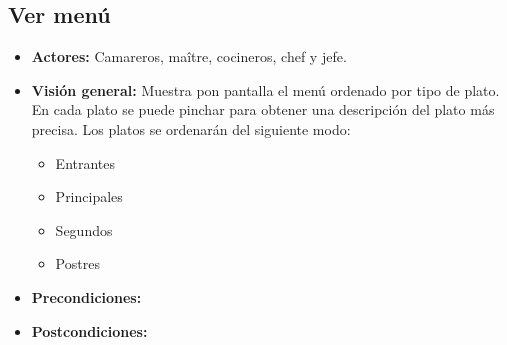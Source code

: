 \documentclass[spanish,a4paper,11pt, twoside]{report}	%
\begin{document}
 	
	\subsection{Ver menú}
			\begin{itemize}
			\item \textbf{Actores:} Camareros, maître, cocineros, chef y jefe.
			\item \textbf{Visión general:} Muestra pon pantalla el menú ordenado por tipo de plato. En cada plato se puede pinchar para obtener una descripción del plato más precisa. Los platos se ordenarán del siguiente modo:
			\begin{itemize}
				\item 	 Entrantes
				\item 	 Principales
				\item 	 Segundos
				\item 	 Postres
				\end {itemize}
			\item \textbf{Precondiciones:} 
			\item \textbf{Postcondiciones:} 
		\end {itemize}

	\newpage
	\hspace{1 true cm}	
\end{document}
